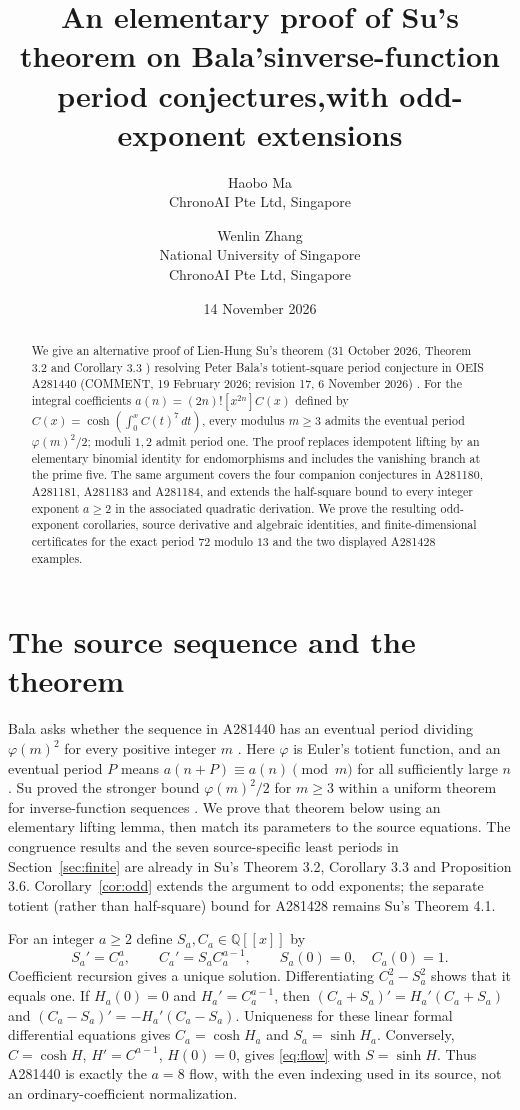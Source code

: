 \documentclass[11pt]{article}
\title{An elementary proof of Su's theorem on Bala's\newline inverse-function period conjectures,\newline with odd-exponent extensions}
\author{Haobo Ma\\\small ChronoAI Pte Ltd, Singapore
\and Wenlin Zhang\\\small National University of Singapore\\\small ChronoAI Pte Ltd, Singapore}
\date{14 November 2026}
\newcommand{\QQ}{\mathbb Q}
\begin{document}
\maketitle
\begin{abstract}
We give an alternative proof of Lien-Hung Su's theorem (31 October 2026, Theorem 3.2 and Corollary 3.3 \cite{su}) resolving Peter Bala's totient-square period conjecture in OEIS A281440 (COMMENT, 19 February 2026; revision 17, 6 November 2026) \cite{oeis440}.
For the integral coefficients $a(n)=(2n)![x^{2n}]C(x)$ defined by
$C(x)=\cosh(\int_0^x C(t)^7\,dt)$, every modulus $m\ge3$ admits the eventual period $\varphi(m)^2/2$; moduli $1,2$ admit period one.
The proof replaces idempotent lifting by an elementary binomial identity for endomorphisms and includes the vanishing branch at the prime five.
The same argument covers the four companion conjectures in A281180, A281181, A281183 and A281184, and extends the half-square bound to every integer exponent $a\ge2$ in the associated quadratic derivation.
We prove the resulting odd-exponent corollaries, source derivative and algebraic identities, and finite-dimensional certificates for the exact period $72$ modulo $13$ and the two displayed A281428 examples.
\end{abstract}

\section{The source sequence and the theorem}
Bala asks whether the sequence in A281440 has an eventual period dividing
$\varphi(m)^2$ for every positive integer $m$ \cite{oeis440}.
Here $\varphi$ is Euler's totient function, and an eventual period $P$ means
$a(n+P)\equiv a(n)\pmod m$ for all sufficiently large $n$.
Su proved the stronger bound $\varphi(m)^2/2$ for $m\ge3$ within a uniform theorem
for inverse-function sequences \cite[Theorem 3.2]{su}.
We prove that theorem below using an elementary lifting lemma, then match its
parameters to the source equations. The congruence results and the seven
source-specific least periods in Section~\ref{sec:finite} are already in Su's
Theorem 3.2, Corollary 3.3 and Proposition 3.6.
Corollary~\ref{cor:odd} extends the argument to odd exponents; the separate
totient (rather than half-square) bound for A281428 remains Su's Theorem 4.1.

For an integer $a\ge2$ define $S_a,C_a\in\QQ[[x]]$ by
\begin{equation}\label{eq:flow}
 S_a'=C_a^a,\qquad C_a'=S_aC_a^{a-1},\qquad S_a(0)=0,\quad C_a(0)=1.
\end{equation}
Coefficient recursion gives a unique solution. Differentiating $C_a^2-S_a^2$
shows that it equals one. If $H_a(0)=0$ and $H_a'=C_a^{a-1}$, then
$(C_a+S_a)'=H_a'(C_a+S_a)$ and
$(C_a-S_a)'=-H_a'(C_a-S_a)$. Uniqueness for these linear formal differential
equations gives $C_a=\cosh H_a$ and $S_a=\sinh H_a$.
Conversely, $C=\cosh H$, $H'=C^{a-1}$, $H(0)=0$, gives \eqref{eq:flow} with
$S=\sinh H$. Thus A281440 is exactly the $a=8$ flow, with the even indexing
used in its source, not an ordinary-coefficient normalization.
\end{document}
